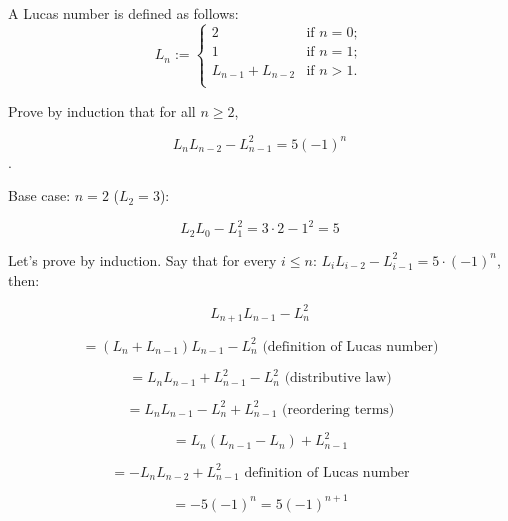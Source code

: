 \documentclass[handout]{mcs}
\begin{document}
\renewcommand{\reading}{
  Final
}







\begin{problem}
A Lucas number is defined as follows:
\begin{equation}
  L_n :=
  \begin{cases}
    2               & \text{if } n = 0; \\
    1               & \text{if } n = 1; \\
    L_{n-1}+L_{n-2} & \text{if } n > 1. \\
   \end{cases}
\end{equation}

Prove by induction that for all $n \geq 2$,

$$ L_n L_{n-2} - L_{n-1}^2 = 5 (-1)^n$$.

\begin{solution}

Base case: $n=2$ ($L_2 = 3$):

$$L_2 L_0 - L_1^2 = 3 \cdot 2 - 1^2 = 5$$

Let's prove by induction. Say that for every $i \leq n$: $L_i L_{i-2} - L_{i-1}^2 = 5 \cdot (-1)^n$, then:

$$L_{n+1} L_{n-1} - L_n^2$$

$$= (L_n+L_{n-1}) L_{n-1} - L_n^2 \mbox{ (definition of Lucas number)}$$

$$ = L_n L_{n-1} + L_{n-1}^2 -L_n^2 \mbox{ (distributive law)}$$

$$ = L_n L_{n-1} - L_n^2 +L_{n-1}^2 \mbox{ (reordering terms)}$$

$$ = L_n(L_{n-1} -L_n) + L_{n-1}^2 $$

$$ = -L_n L_{n-2} + L_{n-1}^2  \mbox{ definition of Lucas number}$$

$$ = - 5 (-1)^n = 5  (-1)^{n+1}$$

\end{solution}

\end{problem}

\end{document}
